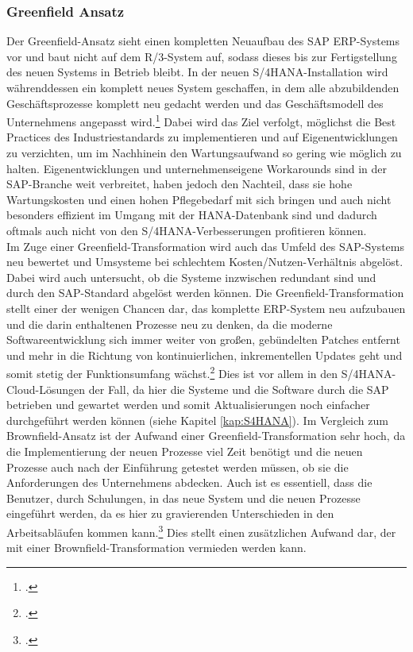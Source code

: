 \subsubsection{Greenfield Ansatz}
Der Greenfield-Ansatz sieht einen kompletten Neuaufbau des SAP ERP-Systems vor und baut nicht auf dem R/3-System auf, sodass dieses bis zur Fertigstellung des neuen Systems in Betrieb bleibt. In der neuen S/4HANA-Installation wird währenddessen ein komplett neues System geschaffen, in dem alle abzubildenden Geschäftsprozesse komplett neu gedacht werden und das Geschäftsmodell des Unternehmens angepasst wird.\footcite[Vgl.][]{ao-blog} Dabei wird das Ziel verfolgt, möglichst die \glqq{}Best Practices\grqq{} des Industriestandards zu implementieren und auf Eigenentwicklungen zu verzichten, um im Nachhinein den Wartungsaufwand so gering wie möglich zu halten. Eigenentwicklungen und unternehmenseigene Workarounds sind in der SAP-Branche weit verbreitet, haben jedoch den Nachteil, dass sie hohe Wartungskosten und einen hohen Pflegebedarf mit sich bringen und auch nicht besonders effizient im Umgang mit der HANA-Datenbank sind und dadurch oftmals auch nicht von den S/4HANA-Verbesserungen profitieren können.\\Im Zuge einer Greenfield-Transformation wird auch das Umfeld des SAP-Systems neu bewertet und Umsysteme bei schlechtem Kosten/Nutzen-Verhältnis abgelöst. Dabei wird auch untersucht, ob die Systeme inzwischen redundant sind und durch den SAP-Standard abgelöst werden können. Die Greenfield-Transformation stellt einer der wenigen Chancen dar, das komplette ERP-System neu aufzubauen und die darin enthaltenen Prozesse neu zu denken, da die moderne Softwareentwicklung sich immer weiter von großen, gebündelten Patches entfernt und mehr in die Richtung von kontinuierlichen, inkrementellen Updates geht und somit stetig der Funktionsumfang wächst.\footcite[Vgl.][]{gambit-transformation} Dies ist vor allem in den S/4HANA-Cloud-Lösungen der Fall, da hier die Systeme und die Software durch die SAP betrieben und gewartet werden und somit Aktualisierungen noch einfacher durchgeführt werden können (siehe Kapitel \ref{kap:S4HANA}). Im Vergleich zum Brownfield-Ansatz ist der Aufwand einer Greenfield-Transformation sehr hoch, da die Implementierung der neuen Prozesse viel Zeit benötigt und die neuen Prozesse auch nach der Einführung getestet werden müssen, ob sie die Anforderungen des Unternehmens abdecken. Auch ist es essentiell, dass die Benutzer, durch Schulungen, in das neue System und die neuen Prozesse eingeführt werden, da es hier zu gravierenden Unterschieden in den Arbeitsabläufen kommen kann.\footcite[Vgl.][]{gambit-transformation} Dies stellt einen zusätzlichen Aufwand dar, der mit einer Brownfield-Transformation vermieden werden kann.

